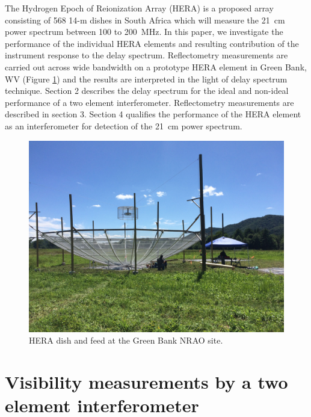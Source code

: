 \documentclass[12pt,preprint]{aastex}
\begin{document}
The Hydrogen Epoch of Reionization Array (HERA) is a proposed array consisting of 568 14-m dishes in South Africa which will measure the 21~cm power spectrum between 100 to 200~MHz.
In this paper, we investigate the performance of the individual HERA elements and resulting contribution of the instrument response to the delay spectrum.
 Reflectometry measurements  are carried out across wide bandwidth on a prototype HERA element in Green
Bank, WV (Figure \ref{fig:heradish}) and the results are interpreted in the light of delay spectrum technique. Section 2 describes the delay spectrum for the ideal and non-ideal performance of a two element interferometer. Reflectometry measurements are described in section 3. Section 4 qualifies the performance of the HERA element as an interferometer for detection of the 21~cm power spectrum.


\begin{figure}[ht!]
\centering
\includegraphics[trim={2cm 20cm 30cm 15cm},clip, totalheight=0.3\textheight]{plots/heradish.jpg}
\caption{HERA dish and feed at the Green Bank NRAO site.}
\label{fig:heradish}
\end{figure}

\section{Visibility measurements by a two element interferometer}
\end{document}
